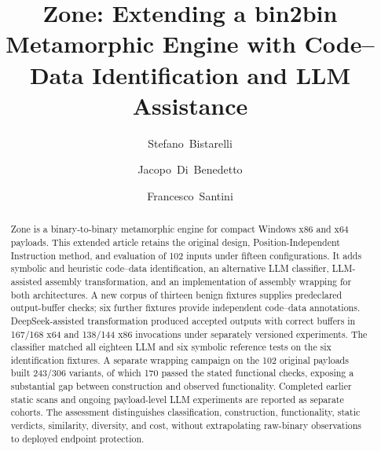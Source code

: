 \documentclass[runningheads]{llncs}
\newif\ifworkingdraft
\newcommand{\draftnote}[1]{\ifworkingdraft\par\smallskip\noindent
 {\color{draftblue}\small\textbf{Draft note.} #1}\par\smallskip\fi}
\begin{document}
\title{Zone: Extending a bin2bin Metamorphic Engine with Code--Data Identification and LLM Assistance}
\author{Stefano~Bistarelli \and
Jacopo~Di~Benedetto \and
Francesco~Santini}
\maketitle

\begin{abstract}
Zone is a binary-to-binary metamorphic engine for compact Windows x86
and x64 payloads. This extended article retains the original design,
Position-Independent Instruction method, and evaluation of 102 inputs
under fifteen configurations. It adds symbolic and heuristic code--data
identification, an alternative LLM classifier, LLM-assisted assembly
transformation, and an implementation of assembly wrapping for both
architectures. A new corpus of thirteen benign fixtures supplies
predeclared output-buffer checks; six further fixtures provide
independent code--data annotations. DeepSeek-assisted transformation
produced accepted outputs with correct buffers in 167/168 x64 and
138/144 x86 invocations under separately versioned experiments.
The classifier matched all eighteen LLM and six symbolic reference
tests on the six identification fixtures. A separate wrapping campaign
on the 102 original payloads built 243/306 variants, of which 170
passed the stated functional checks, exposing a substantial gap
between construction and observed functionality. Completed earlier
static scans and ongoing payload-level LLM experiments are reported
as separate cohorts. The assessment distinguishes classification,
construction, functionality, static verdicts, similarity, diversity,
and cost, without extrapolating raw-binary observations to deployed
endpoint protection.
\end{abstract}
\draftnote{Results are frozen at 21:20 CET on 13 November 2026.
The completed benign benchmark, earlier scan cohort, and current
payload campaign have separate denominators. The full-corpus LLM and
current scan campaigns are still in progress.}
\end{document}

